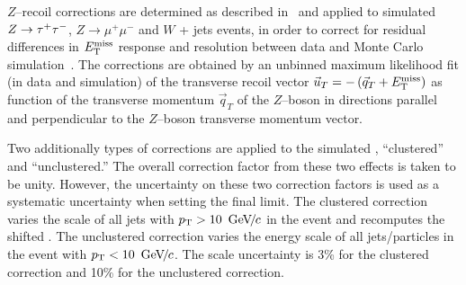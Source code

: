 $Z$--recoil corrections are determined as described in~\cite{CMS_AN_2010-332}
and applied to simulated $Z \to \tau^+\tau^-$, $Z \rightarrow \mu^+\mu^-$ and $W$ + jets
events, in order to correct for residual differences in $E_{\mathrm{T}}^{\text{miss}}$ response and
resolution between data and Monte Carlo simulation~\cite{CMS_AN_2010-460}. The
corrections are obtained by an unbinned maximum likelihood fit (in data and
simulation) of the transverse recoil vector $\vec{u}_{T} = -\left( \vec{q}_{T} +
E_{\mathrm{T}}^{\text{miss}} \right)$ as function of the transverse momentum $\vec{q}_{T}$ of the
$Z$--boson in directions parallel and perpendicular to the $Z$--boson transverse
momentum vector.  

Two additionally types of corrections are applied to the simulated \MET,
``clustered'' and ``unclustered.''  The overall correction factor from these two
effects is taken to be unity.  However, the uncertainty on these two correction
factors is used as a systematic uncertainty when setting the final limit. The
clustered \MET correction varies the scale of all jets with \mbox{$p_{\mathrm{T}} >
10~{\,\text{Ge\hspace{-.08em}V\hspace{-0.16em}/\hspace{-0.08em}}c}$} in the event and recomputes the shifted \MET.  The unclustered \MET
correction varies the energy scale of all jets/particles in the event with
\mbox{$p_{\mathrm{T}} < 10~{\,\text{Ge\hspace{-.08em}V\hspace{-0.16em}/\hspace{-0.08em}}c}$}.  The scale uncertainty is 3\% for the clustered
correction and 10\% for the unclustered correction.

